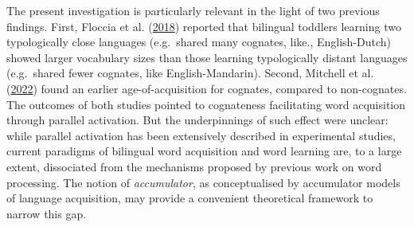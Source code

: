 \documentclass[
]{article}
\begin{document}
The present investigation is particularly relevant in the light of two
previous findings. First, Floccia et al.
(\protect\hyperlink{ref-floccia2018introduction}{2018}) reported that
bilingual toddlers learning two typologically close languages
(e.g.~shared many cognates, like., English-Dutch) showed larger
vocabulary sizes than those learning typologically distant languages
(e.g.~shared fewer cognates, like English-Mandarin). Second, Mitchell et
al. (\protect\hyperlink{ref-mitchell2022cognates}{2022}) found an
earlier age-of-acquisition for cognates, compared to non-cognates. The
outcomes of both studies pointed to cognateness facilitating word
acquisition through parallel activation. But the underpinnings of such
effect were unclear: while parallel activation has been extensively
described in experimental studies, current paradigms of bilingual word
acquisition and word learning are, to a large extent, dissociated from
the mechanisms proposed by previous work on word processing. The notion
of \emph{accumulator}, as conceptualised by accumulator models of
language acquisition, may provide a convenient theoretical framework to
narrow this gap.
\end{document}
